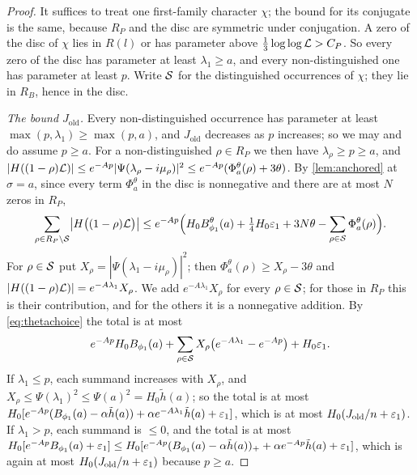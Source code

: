 \begin{proof}
It suffices to treat one first-family character $\chi$; the bound for its conjugate is the same,
because $R_P$ and the disc are symmetric under conjugation. A zero of the disc of $\chi$ lies in $R(l)$
or has parameter above $\frac13\log\log\mathcal{L}>C_P$. So every zero of the disc has parameter at least
$\lambda_1\ge a$, and every non-distinguished one has parameter at least $p$. Write $\mathcal{S}$ for the
distinguished occurrences of $\chi$; they lie in $R_B$, hence in the disc.

\emph{The bound $J_{\mathrm{old}}$.} Every non-distinguished occurrence has parameter at least
$\max(p,\lambda_1)\ge\max(p,a)$, and $J_{\mathrm{old}}$ decreases as $p$ increases; so we may and do
assume $p\ge a$. For a non-distinguished $\rho\in R_P$ we then have $\lambda_\rho\ge p\ge a$, and
$|H((1-\rho)\mathcal{L})|\le e^{-Ap}|\Psi(\lambda_\rho-i\mu_\rho)|^2\le e^{-Ap}(\Phi^\theta_a(\rho)+3\theta)$. By
\cref{lem:anchored} at $\sigma=a$, since every term $\Phi^\theta_a$ in the disc is nonnegative and there are
at most $N$ zeros in $R_P$,
\[
  \sum_{\rho\in R_P\setminus\mathcal{S}}\bigl|H\bigl((1-\rho)\mathcal{L}\bigr)\bigr|\le
  e^{-Ap}\Bigl(H_0B^\theta_{\phi_1}(a)+\tfrac14H_0\varepsilon_1+3N\theta-\sum_{\rho\in\mathcal{S}}\Phi^\theta_a(\rho)\Bigr).
\]
For $\rho\in\mathcal{S}$ put $X_\rho=|\Psi(\lambda_1-i\mu_\rho)|^2$; then $\Phi^\theta_a(\rho)\ge X_\rho-3\theta$ and
$|H((1-\rho)\mathcal{L})|=e^{-A\lambda_1}X_\rho$. We add $e^{-A\lambda_1}X_\rho$ for every $\rho\in\mathcal{S}$; for those in $R_P$
this is their contribution, and for the others it is a nonnegative addition. By \eqref{eq:thetachoice}
the total is at most
\[
  e^{-Ap}H_0B_{\phi_1}(a)+\sum_{\rho\in\mathcal{S}}X_\rho\bigl(e^{-A\lambda_1}-e^{-Ap}\bigr)+H_0\varepsilon_1 .
\]
If $\lambda_1\le p$, each summand increases with $X_\rho$, and
$X_\rho\le\Psi(\lambda_1)^2\le\Psi(a)^2=H_0\tilde h(a)$; so the total is at most
$H_0[e^{-Ap}(B_{\phi_1}(a)-\alpha\tilde h(a))+\alpha e^{-A\lambda_1}\tilde h(a)+\varepsilon_1]$, which is at most
$H_0(J_{\mathrm{old}}/n+\varepsilon_1)$. If $\lambda_1>p$, each summand is $\le0$, and the total is at
most $H_0[e^{-Ap}B_{\phi_1}(a)+\varepsilon_1]\le H_0[e^{-Ap}(B_{\phi_1}(a)-\alpha\tilde h(a))_++\alpha e^{-Ap}\tilde h(a)+\varepsilon_1]$,
which is again at most $H_0(J_{\mathrm{old}}/n+\varepsilon_1)$ because $p\ge a$.


\end{proof}
